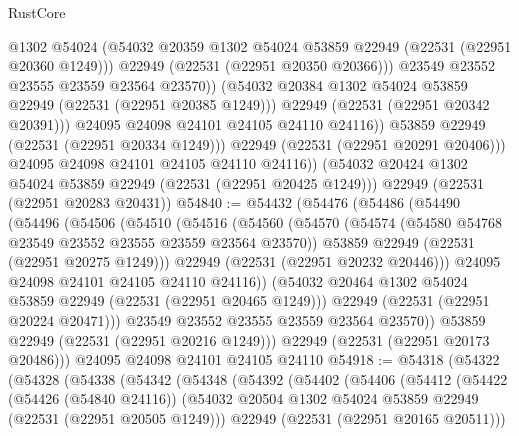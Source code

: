 \begin{lexlean}{RustCore}
\begin{coremodule}
                        @1302
                        @54024
                        (@54032 @20359 @1302 @54024 @53859 @22949 (@22531 (@22951 @20360 @1249)))
                        @22949
                        (@22531 (@22951 @20350 @20366)))
                      @23549
                      @23552
                      @23555
                      @23559
                      @23564
                      @23570))
                  (@54032 @20384 @1302 @54024 @53859 @22949 (@22531 (@22951 @20385 @1249)))
                  @22949
                  (@22531 (@22951 @20342 @20391)))
                @24095
                @24098
                @24101
                @24105
                @24110
                @24116))
            @53859
            @22949
            (@22531 (@22951 @20334 @1249)))
          @22949
          (@22531 (@22951 @20291 @20406)))
        @24095
        @24098
        @24101
        @24105
        @24110
        @24116))
    (@54032 @20424 @1302 @54024 @53859 @22949 (@22531 (@22951 @20425 @1249)))
    @22949
    (@22531 (@22951 @20283 @20431))
@54840 := @54432
    (@54476
      (@54486
        (@54490
          (@54496
            (@54506
              (@54510
                (@54516
                  (@54560
                    (@54570
                      (@54574 (@54580 @54768 @23549 @23552 @23555 @23559 @23564 @23570))
                      @53859
                      @22949
                      (@22531 (@22951 @20275 @1249)))
                    @22949
                    (@22531 (@22951 @20232 @20446)))
                  @24095
                  @24098
                  @24101
                  @24105
                  @24110
                  @24116))
              (@54032 @20464 @1302 @54024 @53859 @22949 (@22531 (@22951 @20465 @1249)))
              @22949
              (@22531 (@22951 @20224 @20471)))
            @23549
            @23552
            @23555
            @23559
            @23564
            @23570))
        @53859
        @22949
        (@22531 (@22951 @20216 @1249)))
      @22949
      (@22531 (@22951 @20173 @20486)))
    @24095
    @24098
    @24101
    @24105
    @24110
@54918 := @54318
    (@54322
      (@54328
        (@54338
          (@54342
            (@54348
              (@54392
                (@54402
                  (@54406
                    (@54412
                      (@54422
                        (@54426 (@54840 @24116))
                        (@54032 @20504 @1302 @54024 @53859 @22949 (@22531 (@22951 @20505 @1249)))
                        @22949
                        (@22531 (@22951 @20165 @20511)))

\end{coremodule}
\end{lexlean}
